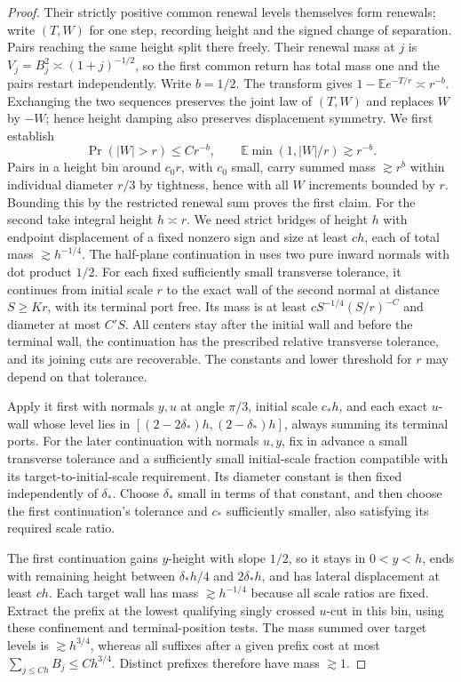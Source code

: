 \begin{proof}
Their strictly positive common renewal levels themselves form renewals;
write $(T,W)$ for one step, recording height and the signed change of
separation. Pairs reaching the same height split there freely. Their
renewal mass at $j$ is $V_j=B_j^2\asymp(1+j)^{-1/2}$, so the first common
return has total mass one and the pairs restart independently.
Write $b=1/2$. The transform gives
$1-\mathbb E e^{-T/r}\asymp r^{-b}$. Exchanging the two sequences preserves
the joint law of $(T,W)$ and replaces $W$ by $-W$; hence height damping
also preserves displacement symmetry. We first establish
\[
 \Pr(|W|>r)\le C r^{-b},\qquad
 \mathbb E\min(1,|W|/r)\gtrsim r^{-b}.
\]
Pairs in a height bin around \(c_0 r\), with \(c_0\) small, carry summed mass \(\gtrsim r^b\) within individual diameter \(r/3\) by tightness, hence with all \(W\) increments bounded by \(r\). Bounding this by the restricted renewal sum proves the first claim. For the second take integral height \(h\asymp r\). We need strict bridges of height $h$ with endpoint displacement of a fixed nonzero sign and size at least $ch$, each of total mass $\gtrsim h^{-1/4}$. The half-plane continuation in \cite[Section~11, Recoverable half-plane growth]{Calibrated} uses two pure inward normals with dot product $1/2$. For each fixed sufficiently small transverse tolerance, it continues from initial scale $r$ to the exact wall of the second normal at distance $S\ge Kr$, with its terminal port free. Its mass is at least $cS^{-1/4}(S/r)^{-C}$ and diameter at most $C'S$. All centers stay after the initial wall and before the terminal wall, the continuation has the prescribed relative transverse tolerance, and its joining cuts are recoverable. The constants and lower threshold for $r$ may depend on that tolerance.

Apply it first with normals $y,u$ at angle $\pi/3$, initial scale $c_*h$,
and each exact $u$-wall whose level lies in
$[(2-2\delta_*)h,(2-\delta_*)h]$, always summing its terminal ports.
For the later continuation with normals $u,y$, fix in advance a small
transverse tolerance and a sufficiently small initial-scale fraction
compatible with its target-to-initial-scale requirement. Its diameter
constant is then fixed independently of $\delta_*$. Choose $\delta_*$
small in terms of that constant, and then choose the first continuation's
tolerance and $c_*$ sufficiently smaller, also satisfying its required
scale ratio.

The first continuation gains $y$-height with slope $1/2$, so it stays in
$0<y<h$, ends with remaining height between $\delta_*h/4$ and
$2\delta_*h$, and has lateral displacement at least $ch$. Each target
wall has mass $\gtrsim h^{-1/4}$ because all scale ratios are fixed.
Extract the prefix at the lowest qualifying singly crossed $u$-cut in
this bin, using these confinement and terminal-position tests. The mass
summed over target levels is $\gtrsim h^{3/4}$, whereas all suffixes after
a given prefix cost at most $\sum_{j\le Ch}B_j\le Ch^{3/4}$. Distinct
prefixes therefore have mass $\gtrsim1$.


\end{proof}
